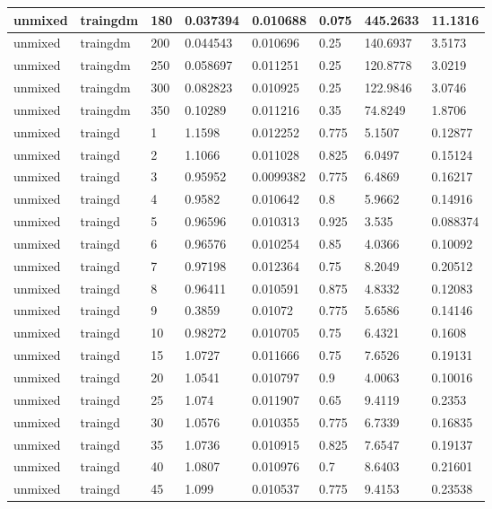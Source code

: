 \begin{longtable}{llllllll}
unmixed & traingdm & 180 & 0.037394 & 0.010688 & 0.075 & 445.2633 & 11.1316 \\ \hline 
unmixed & traingdm & 200 & 0.044543 & 0.010696 & 0.25 & 140.6937 & 3.5173 \\ \hline 
unmixed & traingdm & 250 & 0.058697 & 0.011251 & 0.25 & 120.8778 & 3.0219 \\ \hline 
unmixed & traingdm & 300 & 0.082823 & 0.010925 & 0.25 & 122.9846 & 3.0746 \\ \hline 
unmixed & traingdm & 350 & 0.10289 & 0.011216 & 0.35 & 74.8249 & 1.8706 \\ \hline 
unmixed & traingd & 1 & 1.1598 & 0.012252 & 0.775 & 5.1507 & 0.12877 \\ \hline 
unmixed & traingd & 2 & 1.1066 & 0.011028 & 0.825 & 6.0497 & 0.15124 \\ \hline 
unmixed & traingd & 3 & 0.95952 & 0.0099382 & 0.775 & 6.4869 & 0.16217 \\ \hline 
unmixed & traingd & 4 & 0.9582 & 0.010642 & 0.8 & 5.9662 & 0.14916 \\ \hline 
unmixed & traingd & 5 & 0.96596 & 0.010313 & 0.925 & 3.535 & 0.088374 \\ \hline 
unmixed & traingd & 6 & 0.96576 & 0.010254 & 0.85 & 4.0366 & 0.10092 \\ \hline 
unmixed & traingd & 7 & 0.97198 & 0.012364 & 0.75 & 8.2049 & 0.20512 \\ \hline 
unmixed & traingd & 8 & 0.96411 & 0.010591 & 0.875 & 4.8332 & 0.12083 \\ \hline 
unmixed & traingd & 9 & 0.3859 & 0.01072 & 0.775 & 5.6586 & 0.14146 \\ \hline 
unmixed & traingd & 10 & 0.98272 & 0.010705 & 0.75 & 6.4321 & 0.1608 \\ \hline 
unmixed & traingd & 15 & 1.0727 & 0.011666 & 0.75 & 7.6526 & 0.19131 \\ \hline 
unmixed & traingd & 20 & 1.0541 & 0.010797 & 0.9 & 4.0063 & 0.10016 \\ \hline 
unmixed & traingd & 25 & 1.074 & 0.011907 & 0.65 & 9.4119 & 0.2353 \\ \hline 
unmixed & traingd & 30 & 1.0576 & 0.010355 & 0.775 & 6.7339 & 0.16835 \\ \hline 
unmixed & traingd & 35 & 1.0736 & 0.010915 & 0.825 & 7.6547 & 0.19137 \\ \hline 
unmixed & traingd & 40 & 1.0807 & 0.010976 & 0.7 & 8.6403 & 0.21601 \\ \hline 
unmixed & traingd & 45 & 1.099 & 0.010537 & 0.775 & 9.4153 & 0.23538 \\ \hline 

\end{longtable}

